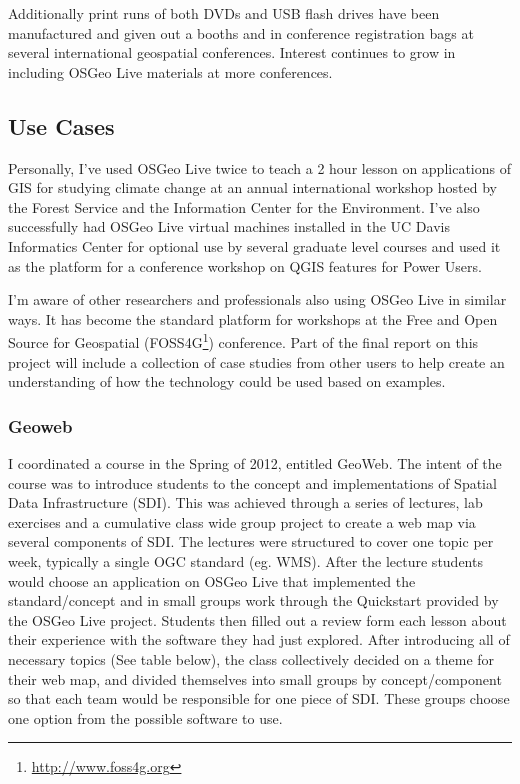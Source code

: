 \documentclass[12pt,letterpaper]{article}
\begin{document}
Additionally print runs of both DVDs and USB flash drives have been manufactured and given out a booths and in conference registration bags at several international geospatial conferences. Interest continues to grow in including OSGeo Live materials at more conferences.

\subsection{Use Cases}
Personally, I've used OSGeo Live twice to teach a 2 hour lesson on applications of GIS for studying climate change at an annual international workshop hosted by the Forest Service and the Information Center for the Environment. I've also successfully had OSGeo Live virtual machines installed in the UC Davis Informatics Center for optional use by several graduate level courses and used it as the platform for a conference workshop on QGIS features for Power Users.

I'm aware of other researchers and professionals also using OSGeo Live in similar ways. It has become the standard platform for workshops at the Free and Open Source for Geospatial (FOSS4G\footnote{\url{http://www.foss4g.org}}) conference.  Part of the final report on this project will include a collection of  case studies from other users to help create an understanding of how the technology could be used based on examples. 

\subsubsection{Geoweb}
I coordinated a course in the Spring of 2012, entitled GeoWeb. The intent of the course was to introduce students to the concept and implementations of Spatial Data Infrastructure (SDI). This was achieved through a series of lectures, lab exercises and a cumulative class wide group project to create a web map via several components of SDI. The lectures were structured to cover one topic per week, typically a single OGC standard (eg. WMS). After the lecture students would choose an application on OSGeo Live that implemented the standard/concept and in small groups work through the Quickstart provided by the OSGeo Live project. Students then filled out a review form each lesson about their experience with the software they had just explored. After introducing all of necessary topics (See table below), the class collectively decided on a theme for their web map, and divided themselves into small groups by concept/component so that each team would be responsible for one piece of SDI. These groups choose one option from the possible software to use.
\end{document}
